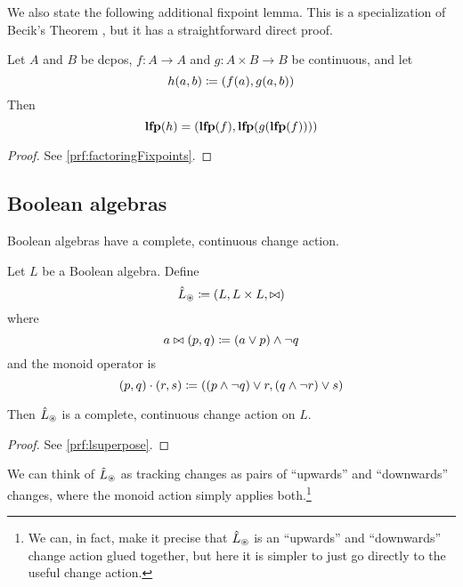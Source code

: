We also state the following additional fixpoint lemma. This is a specialization of
Becik's Theorem \autocite[][section 10.1]{winskel1993formal}, but it has a straightforward direct proof.

\begin{prop}[name=Factoring of fixpoints, restate=factoringFixpoints]
  \label{prop:factoringFixpoints}
  Let $A$ and $B$ be dcpos, $f : A \rightarrow A$ and $g: A \times B \rightarrow B$ be continuous, and let
  \begin{displaymath}
    h(a, b) \coloneqq (f(a), g(a, b))
  \end{displaymath}
  Then
  \begin{displaymath}
    \textbf{lfp}(h) = (\textbf{lfp}(f), \textbf{lfp}(g(\textbf{lfp}(f))))
  \end{displaymath}
\end{prop}
\ifproofs
\begin{proof}
  See \cref{prf:factoringFixpoints}.
\end{proof}
\fi

\subsection{Boolean algebras}

Boolean algebras have a complete, continuous change action.

\begin{prop}[restate=lsuperpose]
  Let $L$ be a Boolean algebra. Define
  \begin{displaymath}
    \hat{L}_\circledast \coloneqq (L,L \times L,\bowtie)
  \end{displaymath}
  where
  \begin{displaymath}
    a \bowtie (p, q) \coloneqq (a \vee p) \wedge \neg q
  \end{displaymath}
  and the monoid operator is
  \begin{displaymath}
    (p, q) \cdot (r, s) \coloneqq ((p \wedge \neg q) \vee r, (q \wedge \neg r) \vee s)
  \end{displaymath}

  Then $\hat{L}_\circledast$ is a complete, continuous change action on $L$.
\end{prop}
\ifproofs
\begin{proof}
  See \cref{prf:lsuperpose}.
\end{proof}
\fi

We can think of $\hat{L}_\circledast$ as tracking changes as pairs of ``upwards'' and
``downwards'' changes, where the monoid action simply applies both.\footnote{We
  can, in fact, make it precise that $\hat{L}_\circledast$ is an ``upwards''
  and ``downwards'' change action glued together, but here it is simpler to
  just go directly to the useful change action.}  

